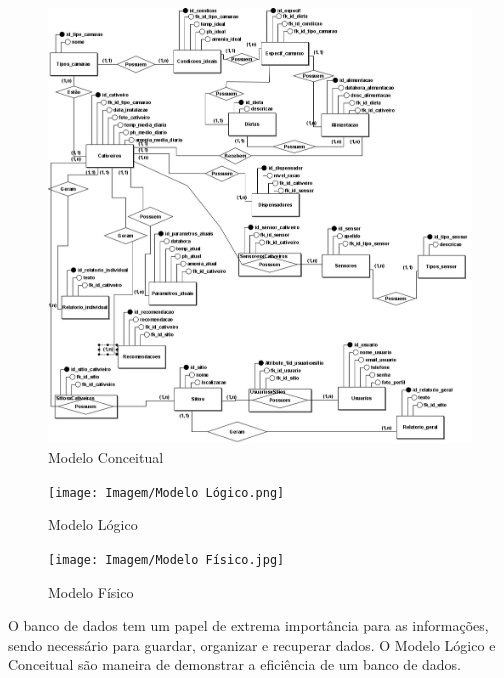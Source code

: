 \documentclass[
  a4paper,
  12pt,
  english,
  brazilian,
]{article}
\begin{document}
\begin{figure}[!htb]
\caption{Modelo Conceitual}%
\includegraphics[width = 1.5\CaptionWidth]{Imagem/Modelo Conceitual.jpeg}
\end{figure}

\newpage

\begin{figure}[!htb]
\caption{Modelo Lógico}%
\texttt{[image: Imagem/Modelo Lógico.png]}
\end{figure}

\newpage

\begin{figure}[!htb]
\caption{Modelo Físico}%
\texttt{[image: Imagem/Modelo Físico.jpg]}
\end{figure}

O banco de dados tem um papel de extrema importância para as informações, sendo necessário para guardar, organizar e recuperar dados. O Modelo Lógico e Conceitual são maneira de demonstrar a eficiência de um banco de dados.

\newpage
\end{document}
